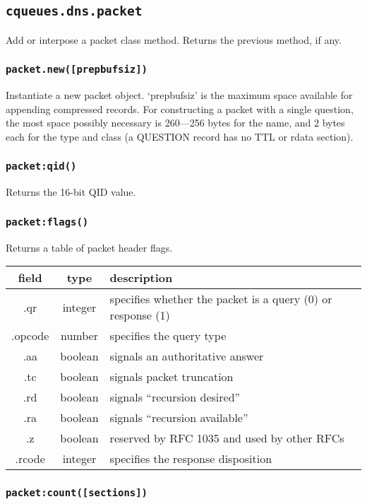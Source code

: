 \documentclass[11pt, oneside]{memoir}
\newcommand{\fn}[1]{\texttt{#1} }
\newcounter{toccols}
\newenvironment{Module}[1]{
	\subsection{\texttt{#1}}
	\addtocontents{toc}{
		\protect\begin{multicols}{\value{toccols}}
	}
}{
	\addtocontents{toc}{\protect\end{multicols}}
}
\begin{document}
\begin{Module}{cqueues.dns.packet}
Add or interpose a packet class method. Returns the previous method, if any.

\subsubsection[\fn{packet.new}]{\fn{packet.new([prepbufsiz])}}

Instantiate a new packet object. `prepbufsiz' is the maximum space available for appending compressed records. For constructing a packet with a single question, the most space possibly necessary is 260---256 bytes for the name, and 2 bytes each for the type and class (a QUESTION record has no TTL or rdata section).

\subsubsection[\fn{packet:qid}]{\fn{packet:qid()}}

Returns the 16-bit QID value.

\subsubsection[\fn{packet:flags}]{\fn{packet:flags()}}

Returns a table of packet header flags.

\begin{tabular}{ c | c | l }
field & type & description\\\hline
.qr & integer & specifies whether the packet is a query (0) or response (1)\\
.opcode & number & specifies the query type\\
.aa & boolean & signals an authoritative answer\\
.tc & boolean & signals packet truncation\\
.rd & boolean & signals ``recursion desired''\\
.ra & boolean & signals ``recursion available''\\
.z & boolean & reserved by RFC 1035 and used by other RFCs\\
.rcode & integer & specifies the response disposition
\end{tabular}

\subsubsection[\fn{packet:count}]{\fn{packet:count([sections])}}


\end{Module}
\end{document}
